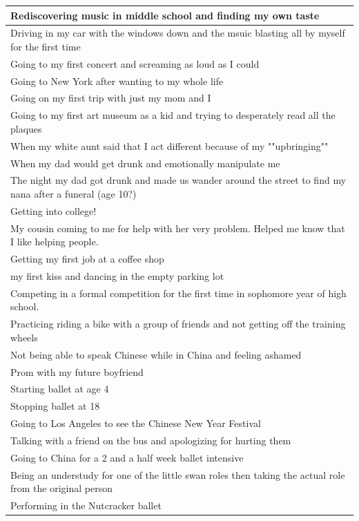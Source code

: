 \documentclass[
  .7em,
  letterpaper,
  DIV=11,
  numbers=noendperiod]{scrartcl}
\begin{document}
\begin{table}
\begin{tabular}{l}
\hline
Rediscovering music in middle school and finding my own taste\\
\hline
Driving in my car with the windows down and the msuic blasting all by myself for the first time\\
\hline
Going to my first concert and screaming as loud as I could\\
\hline
Going to New York after wanting to my whole life\\
\hline
Going on my first trip with just my mom and I\\
\hline
Going to my first art museum as a kid and trying to desperately read all the plaques\\
\hline
When my white aunt said that I act different because of my ""upbringing""\\
\hline
When my dad would get drunk and emotionally manipulate me\\
\hline
The night my dad got drunk and made us wander around the street to find my nana after a funeral (age 10?)\\
\hline
Getting into college!\\
\hline
My cousin coming to me for help with her very problem. Helped me know that I like helping people.\\
\hline
Getting my first job at a coffee shop\\
\hline
my first kiss and dancing in the empty parking lot\\
\hline
Competing in a formal competition for the first time in sophomore year of high school.\\
\hline
Practicing riding a bike with a group of friends and not getting off the training wheels\\
\hline
Not being able to speak Chinese while in China and feeling ashamed\\
\hline
Prom with my future boyfriend\\
\hline
Starting ballet at age 4\\
\hline
Stopping ballet at 18\\
\hline
Going to Los Angeles to see the Chinese New Year Festival\\
\hline
Talking with a friend on the bus and apologizing for hurting them\\
\hline
Going to China for a 2 and a half week ballet intensive\\
\hline
Being an understudy for one of the little swan roles then taking the actual role from the original person\\
\hline
Performing in the Nutcracker ballet\\

\end{tabular}
\end{table}
\end{document}
